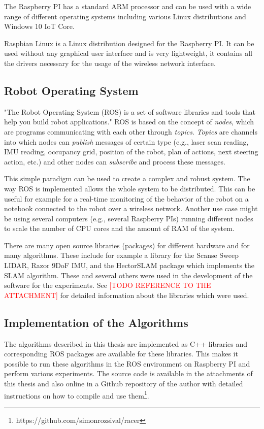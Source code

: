 The Raspberry PI has a standard ARM processor and can be used with a wide range of different operating systems including various Linux distributions and Windows 10 IoT Core.

Raspbian Linux is a Linux distribution designed for the Raspberry PI. It can be used without any graphical user interface and is very lightweight, it contains all the drivers necessary for the usage of the wireless network interface.

\subsection{Robot Operating System}

"The Robot Operating System (ROS) is a set of software libraries and tools that help you build robot applications." \cite{ros} ROS is based on the concept of \textit{nodes}, which are programs communicating with each other through \textit{topics}. \textit{Topics} are channels into which nodes can \textit{publish} messages of certain type (e.g., laser scan reading, IMU reading, occupancy grid, position of the robot, plan of actions, next steering action, etc.) and other nodes can \textit{subscribe} and process these messages.

This simple paradigm can be used to create a complex and robust system. The way ROS is implemented allows the whole system to be distributed. This can be useful for example for a real-time monitoring of the behavior of the robot on a notebook connected to the robot over a wireless network. Another use case might be using several computers (e.g., several Raspberry PIs) running different nodes to scale the number of CPU cores and the amount of RAM of the system.

There are many open source libraries (packages) for different hardware and for many algorithms. These include for example a library for the Scanse Sweep LIDAR, Razor 9DoF IMU, and the HectorSLAM package which implements the SLAM algorithm. These and several others were used in the development of the software for the experiments. See \textcolor{red}{[TODO REFERENCE TO THE ATTACHMENT]} for detailed information about the libraries which were used.

\subsection{Implementation of the Algorithms}

The algorithms described in this thesis are implemented as C++ libraries and corresponding ROS packages are available for these libraries. This makes it possible to run these algorithms in the ROS environment on Raspberry PI and perform various experiments. The source code is available in the attachments of this thesis and also online in a Github repository of the author with detailed instructions on how to compile and use them\footnote{https://github.com/simonrozsival/racer}.